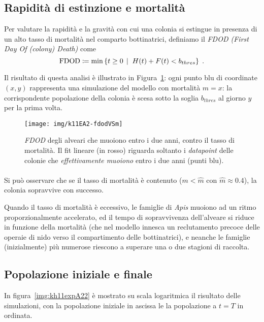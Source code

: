 \subsection{Rapidità di estinzione e mortalità}
\label{sec:fdod}
Per valutare la rapidità e la gravità con cui una colonia si estingue in presenza di un alto tasso di
mortalità nel comparto bottinatrici, definiamo il \emph{FDOD (First Day Of (colony) Death)} come
$$\text{FDOD} \coloneq \min \left\{ t \geq 0 \,\mid\; H(t) + F(t) < b_{thres} \right\} \; .$$

Il risultato di questa analisi è illustrato in Figura~\ref{img:kh11expA21}: ogni punto blu di coordinate $(x,y)$
rappresenta una simulazione del modello con mortalità $m=x$: la corrispondente popolazione
della colonia è scesa sotto la soglia $b_{thres}$ al giorno $y$ per la prima volta.
\begin{figure}[hb]
    \centering
    \texttt{[image: img/k11EA2-fdodVSm]}

    \caption[Esperimento A2, \emph{FDOD} vs. mortalità.]{\emph{FDOD} degli alveari che muoiono entro i due anni,
        contro il tasso di mortalità. Il fit lineare (in rosso) riguarda soltanto i \emph{datapoint}
        delle colonie che \emph{effettivamente muoiono} entro i due anni (punti blu).}

    \label{img:kh11expA21}
\end{figure}

\paragraph{}
Si può osservare che se il tasso di mortalità è contenuto ($m< \hat{m}$ con $\hat{m} \approx 0.4$),
la colonia sopravvive con successo.

Quando il tasso di mortalità è eccessivo, le famiglie di \emph{Apis} muoiono ad un ritmo proporzionalmente accelerato, ed
il tempo di sopravvivenza dell'alveare si riduce in funzione della mortalità (che nel modello innesca un reclutamento
precoce delle operaie di nido verso il compartimento delle bottinatrici), e neanche le famiglie (inizialmente) più numerose
riescono a superare una o due stagioni di raccolta.


\subsection{Popolazione iniziale e finale}
In figura~\ref{img:kh11expA22} è mostrato su scala logaritmica il risultato delle simulazioni, con la popolazione
iniziale in ascissa le la popolazione a $t=T$ in ordinata.


